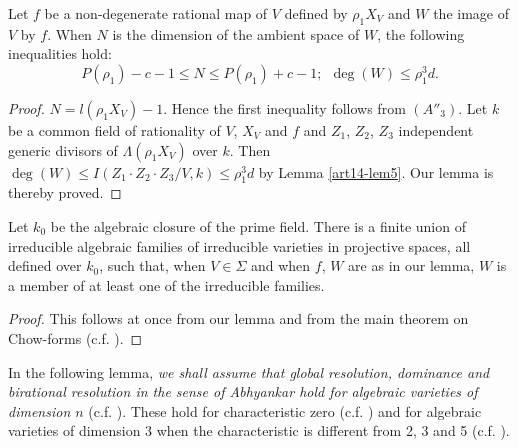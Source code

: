 \begin{lemma}\label{art14-lem8}
Let $f$ be a non-degenerate rational map of $V$ defined by $\rho_{1}X_{V}$ and $W$ the image of $V$ by $f$. When $N$ is the dimension of the ambient space of $W$, the following inequalities hold:
$$
P(\rho_{1})-c-1\leq N\leq P(\rho_{1})+c-1; \ \ \deg(W)\leq \rho^{3}_{1}d.
$$
\end{lemma}

\begin{proof}
$N=l(\rho_{1}X_{V})-1$. Hence the first inequality follows from $(A''_{3})$. Let $k$ be a common field of rationality of $V$, $X_{V}$ and $f$ and $Z_{1}$, $Z_{2}$, $Z_{3}$ independent generic divisors of $\Lambda(\rho_{1}X_{V})$ over $k$. Then $\deg(W)\leq I(Z_{1}\cdot Z_{2}\cdot Z_{3}/V,k)\leq \rho^{3}_{1}d$ by Lemma \ref{art14-lem5}. Our lemma is thereby proved.
\end{proof}

\begin{coro*}
Let $k_{0}$ be the algebraic closure of the prime field. There is a finite union of irreducible algebraic families of irreducible varieties in projective spaces, all defined over $k_{0}$, such that, when $V\in \Sigma$ and when $f$, $W$ are as in our lemma, $W$ is a member of at least one of the irreducible families.
\end{coro*}

\begin{proof}
This follows at once from our lemma and from the main theorem on Chow-forms (c.f. \cite{art14-key3}).
\end{proof}

In the following lemma, {\em we shall assume that global resolution, dominance and birational resolution in the sense of Abhyankar hold for algebraic varieties of dimension $n$} (c.f. \cite{art14-key35}). These hold for characteristic zero (c.f. \cite{art14-key5}) and for algebraic varieties of dimension 3 when the characteristic is different from 2, 3 and 5 (c.f. \cite{art14-key35}).

